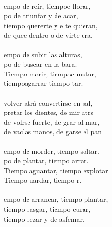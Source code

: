 \begin{cancion}%
	     \\
	empo de reír, tiempoe llorar,\\
	po de triunfar y de acar,\\
	tiempo  quererte y e te quieran,\\
	de quee dentro o de virte era.\\
\jump\\
	empo de subir las alturas,\\
	po de buscar en la bara.\\
	Tiempo  morir, tiempoe matar,\\
	tiempoagarrar tiempo  tar.\\
\jump\\
	 volver atrá convertirse en sal,\\
	pretar los dientes, de mir atrs\\
	de volrse fuerte, de grar al mar,\\
	de vaclas manos, de garse el pan\\
\jump\\
	empo de morder, tiempo  soltar.\\
	po de plantar, tiempo  arrar.\\
	Tiempo  aguantar, tiempo  explotar\\
	Tiempo uardar, tiempo  r.\\
\jump\\
	empo de arrancar, tiempo  plantar,\\
	tiempo  rasgar, tiempo curar,\\
	tiempo  rezar y de asfemar,\\

\end{cancion}
